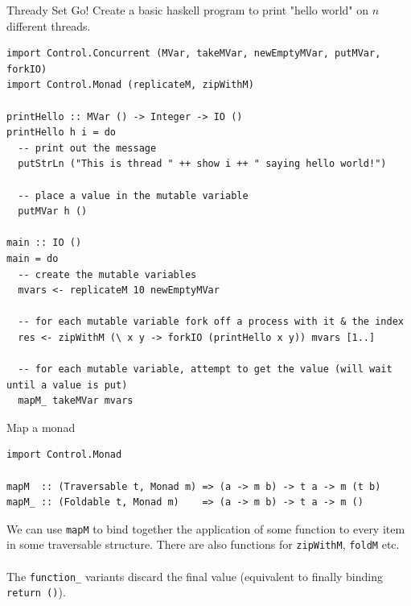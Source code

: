 \begin{examplebox}{Thready Set Go!}
	Create a basic haskell program to print "hello world" on $n$ different threads.
	\tcblower
	\begin{verbatim}
import Control.Concurrent (MVar, takeMVar, newEmptyMVar, putMVar, forkIO)
import Control.Monad (replicateM, zipWithM)

printHello :: MVar () -> Integer -> IO ()
printHello h i = do
  -- print out the message
  putStrLn ("This is thread " ++ show i ++ " saying hello world!")  

  -- place a value in the mutable variable
  putMVar h ()

main :: IO ()
main = do
  -- create the mutable variables
  mvars <- replicateM 10 newEmptyMVar  

  -- for each mutable variable fork off a process with it & the index
  res <- zipWithM (\ x y -> forkIO (printHello x y)) mvars [1..]  

  -- for each mutable variable, attempt to get the value (will wait until a value is put)
  mapM_ takeMVar mvars  
    \end{verbatim}
\end{examplebox}

\begin{sidenotebox}{Map a monad}
	\begin{verbatim}
import Control.Monad

mapM  :: (Traversable t, Monad m) => (a -> m b) -> t a -> m (t b)
mapM_ :: (Foldable t, Monad m)    => (a -> m b) -> t a -> m ()
    \end{verbatim}
	We can use \texttt{mapM} to bind together the application of some function to every item in some traversable structure. There are also functions for \texttt{zipWithM}, \texttt{foldM} etc.
	\\
	\\ The \texttt{function_} variants discard the final value (equivalent to finally binding \texttt{return ()}).
\end{sidenotebox}

